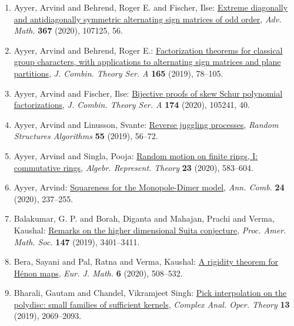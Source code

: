\begin{enumerate}[resume, leftmargin=27pt]
	\item Ayyer, Arvind and Behrend, Roger E. and Fischer, Ilse: \href{https://doi.org/10.1016/j.aim.2020.107125}{Extreme diagonally and antidiagonally symmetric alternating
		      sign matrices of odd order}, \emph{Adv. Math.} {\bf 367} (2020), 107125, 56.

	\item Ayyer, Arvind and Behrend, Roger E.: \href{https://doi.org/10.1016/j.jcta.2019.01.001}{Factorization theorems for classical group characters, with
		      applications to alternating sign matrices and plane
		      partitions}, \emph{J. Combin. Theory Ser. A} {\bf 165} (2019), 78--105.

	\item Ayyer, Arvind and Fischer, Ilse: \href{https://doi.org/10.1016/j.jcta.2020.105241}{Bijective proofs of skew {S}chur polynomial factorizations}, \emph{J. Combin. Theory Ser. A} {\bf 174} (2020), 105241, 40.

	\item Ayyer, Arvind and Linusson, Svante: \href{https://doi.org/10.1002/rsa.20825}{Reverse juggling processes}, \emph{Random Structures Algorithms} {\bf 55} (2019), 56--72.

	\item\label{ayyer-singla:commutative-rings} Ayyer, Arvind and Singla, Pooja:
	      \href{https://doi.org/10.1007/s10468-019-09864-w}{Random motion on finite rings, {I}: commutative
		      rings}, \emph{Algebr. Represent. Theory} {\bf 23} (2020), 583--604.

	\item Ayyer, Arvind: \href{https://doi.org/10.1007/s00026-019-00480-5}{Squareness for the {M}onopole-{D}imer model}, \emph{Ann. Comb.} {\bf 24} (2020), 237--255.

	\item Balakumar, G. P. and Borah, Diganta and Mahajan, Prachi and
	      Verma, Kaushal: \href{https://doi.org/10.1090/proc/14421}{Remarks on the higher dimensional {S}uita conjecture}, \emph{Proc. Amer. Math. Soc.} {\bf 147} (2019), 3401--3411.

	\item Bera, Sayani and Pal, Ratna and Verma, Kaushal: \href{https://doi.org/10.1007/s40879-019-00326-7}{A rigidity theorem for {H}\'{e}non maps}, \emph{Eur. J. Math.} {\bf 6} (2020), 508--532.

	\item Bharali, Gautam and Chandel, Vikramjeet Singh: \href{https://doi.org/10.1007/s11785-017-0701-5}{Pick interpolation on the polydisc: small families of
		      sufficient kernels}, \emph{Complex Anal. Oper. Theory} {\bf 13} (2019), 2069--2093.


\end{enumerate}
